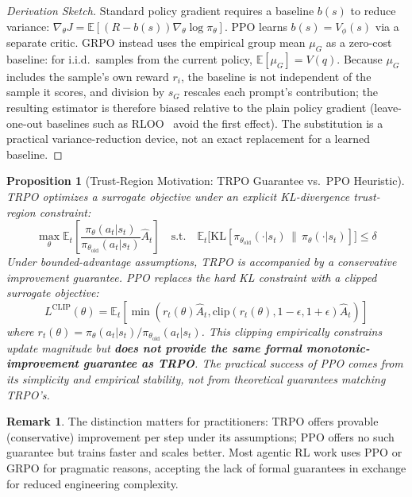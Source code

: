 \documentclass[12pt,a4paper]{report}
\newtheorem{proposition}[theorem]{Proposition}
\theoremstyle{definition}
\newtheorem{remark}[theorem]{Remark}
\begin{document}
\begin{proof}[Derivation Sketch]
Standard policy gradient requires a baseline $b(s)$ to reduce variance: $\nabla_\theta J = \mathbb{E}[(R - b(s)) \nabla_\theta \log \pi_\theta]$. PPO learns $b(s) = V_\phi(s)$ via a separate critic. GRPO instead uses the empirical group mean $\mu_G$ as a zero-cost baseline: for i.i.d.\ samples from the current policy, $\mathbb{E}[\mu_G] = V(q)$. Because $\mu_G$ includes the sample's own reward $r_i$, the baseline is not independent of the sample it scores, and division by $s_G$ rescales each prompt's contribution; the resulting estimator is therefore biased relative to the plain policy gradient (leave-one-out baselines such as RLOO~\cite{ahmadian2024back} avoid the first effect). The substitution is a practical variance-reduction device, not an exact replacement for a learned baseline.
\end{proof}

\begin{proposition}[Trust-Region Motivation: TRPO Guarantee vs.\ PPO Heuristic]
\label{prop:convergence}
TRPO \cite{schulman2015trust} optimizes a surrogate objective under an explicit KL-divergence trust-region constraint:
\begin{equation}
\max_\theta \mathbb{E}_t\left[\frac{\pi_\theta(a_t|s_t)}{\pi_{\theta_{\text{old}}}(a_t|s_t)} \hat{A}_t\right] \quad \text{s.t.} \quad \mathbb{E}_t\big[\text{KL}[\pi_{\theta_{\text{old}}}(\cdot|s_t) \,\|\, \pi_\theta(\cdot|s_t)]\big] \leq \delta
\end{equation}
Under bounded-advantage assumptions, TRPO is accompanied by a conservative improvement guarantee. PPO \cite{schulman2017ppo} replaces the hard KL constraint with a clipped surrogate objective:
\begin{equation}
L^{\text{CLIP}}(\theta) = \mathbb{E}_t\left[\min\left(r_t(\theta)\hat{A}_t, \text{clip}(r_t(\theta), 1-\epsilon, 1+\epsilon)\hat{A}_t\right)\right]
\end{equation}
where $r_t(\theta) = \pi_\theta(a_t|s_t)/\pi_{\theta_{\text{old}}}(a_t|s_t)$. This clipping empirically constrains update magnitude but \textbf{does not provide the same formal monotonic-improvement guarantee as TRPO}. The practical success of PPO comes from its simplicity and empirical stability, not from theoretical guarantees matching TRPO's.
\end{proposition}

\begin{remark}
The distinction matters for practitioners: TRPO offers provable (conservative) improvement per step under its assumptions; PPO offers no such guarantee but trains faster and scales better. Most agentic RL work uses PPO or GRPO for pragmatic reasons, accepting the lack of formal guarantees in exchange for reduced engineering complexity.
\end{remark}
\end{document}

